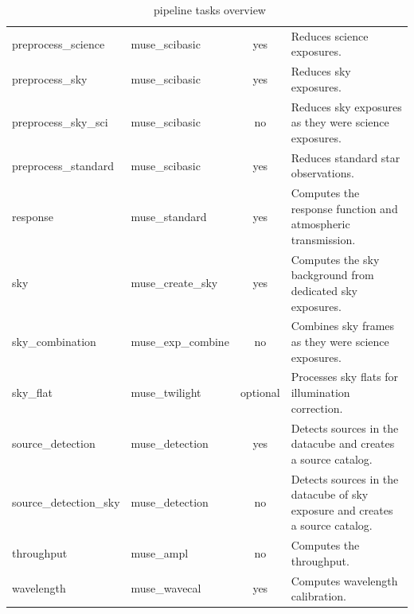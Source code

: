 \begin{table}[htbp]
\begin{tabular}{|l|l|c|p{7cm}|}
preprocess\_science                & muse\_scibasic      & yes      & Reduces science exposures. \\
preprocess\_sky                    & muse\_scibasic      & yes      & Reduces sky exposures. \\
preprocess\_sky\_sci               & muse\_scibasic      & no       & Reduces sky exposures as they were science exposures. \\
preprocess\_standard               & muse\_scibasic      & yes      & Reduces standard star observations. \\
response                           & muse\_standard      & yes      & Computes the response function and atmospheric transmission. \\
sky                                & muse\_create\_sky   & yes      & Computes the sky background from dedicated sky exposures. \\
sky\_combination                   & muse\_exp\_combine  & no       & Combines sky frames as they were science exposures. \\
sky\_flat                          & muse\_twilight      & optional & Processes sky flats for illumination correction. \\
source\_detection                  & muse\_detection     & yes      & Detects sources in the datacube and creates a source catalog. \\
source\_detection\_sky             & muse\_detection     & no       & Detects sources in the datacube of sky exposure and creates a source catalog. \\
throughput                         & muse\_ampl          & no       & Computes the throughput. \\
wavelength                         & muse\_wavecal       & yes      & Computes wavelength calibration. \\
\hline
\end{tabular}
\caption{\instname\ pipeline tasks overview}
\end{table}
